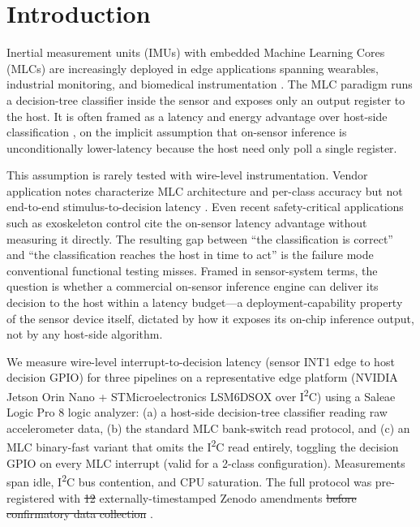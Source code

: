 \documentclass{IEEE_lsens}
\providecommand{\DIFadd}[1]{{\protect\color{blue}\uwave{#1}}} %
\providecommand{\DIFdel}[1]{{\protect\color{red}\sout{#1}}}                      %
\providecommand{\DIFaddbegin}{} %
\providecommand{\DIFaddend}{} %
\providecommand{\DIFdelbegin}{} %
\providecommand{\DIFdelend}{} %
\newcommand{\DIFscaledelfig}{0.5}
\newlength{\DIFdelgraphicswidth} %
\newlength{\DIFdelgraphicsheight} %
\newcommand{\DIFaddincludegraphics}[2][]{{\color{blue}\fbox{\DIFOincludegraphics[#1]{#2}}}} %
\newcommand{\DIFdelincludegraphics}[2][]{%
\sbox{\DIFdelgraphicsbox}{\DIFOincludegraphics[#1]{#2}}%
\settoboxwidth{\DIFdelgraphicswidth}{\DIFdelgraphicsbox} %
\settoboxtotalheight{\DIFdelgraphicsheight}{\DIFdelgraphicsbox} %
\scalebox{\DIFscaledelfig}{%
\parbox[b]{\DIFdelgraphicswidth}{\usebox{\DIFdelgraphicsbox}\\[-\baselineskip] \rule{\DIFdelgraphicswidth}{0em}}\llap{\resizebox{\DIFdelgraphicswidth}{\DIFdelgraphicsheight}{%
\setlength{\unitlength}{\DIFdelgraphicswidth}%
\begin{picture}(1,1)%
\thicklines\linethickness{2pt} %
{\color[rgb]{1,0,0}\put(0,0){\framebox(1,1){}}}%
{\color[rgb]{1,0,0}\put(0,0){\line( 1,1){1}}}%
{\color[rgb]{1,0,0}\put(0,1){\line(1,-1){1}}}%
\end{picture}%
}\hspace*{3pt}}} %
} %
\DeclareRobustCommand{\DIFaddbegin}{\DIFOaddbegin \let\includegraphics\DIFaddincludegraphics} %
\DeclareRobustCommand{\DIFaddend}{\DIFOaddend \let\includegraphics\DIFOincludegraphics} %
\DeclareRobustCommand{\DIFdelbegin}{\DIFOdelbegin \let\includegraphics\DIFdelincludegraphics} %
\DeclareRobustCommand{\DIFdelend}{\DIFOaddend \let\includegraphics\DIFOincludegraphics} %
\begin{document}
\maketitle

\section{Introduction}

Inertial measurement units (IMUs) with embedded Machine Learning Cores (MLCs) are increasingly deployed in edge applications spanning wearables, industrial monitoring, and biomedical instrumentation \cite{ref1}. The MLC paradigm runs a decision-tree classifier inside the sensor and exposes only an output register to the host. It is often framed as a latency and energy advantage over host-side classification \cite{ref2,ref3}, on the implicit assumption that on-sensor inference is unconditionally lower-latency because the host need only poll a single register.

This assumption is rarely tested with wire-level instrumentation. Vendor application notes characterize MLC architecture and per-class accuracy but not end-to-end stimulus-to-decision latency \cite{ref2}. Even recent safety-critical applications such as exoskeleton control \cite{ref3} cite the on-sensor latency advantage without measuring it directly. The resulting gap between ``the classification is correct'' and ``the classification reaches the host in time to act'' is the failure mode conventional functional testing misses. Framed in sensor-system terms, the question is whether a commercial on-sensor inference engine can deliver its decision to the host within a latency budget---a deployment-capability property of the sensor device itself, dictated by how it exposes its on-chip inference output, not by any host-side algorithm.

We measure wire-level interrupt-to-decision latency (sensor INT1 edge to host decision GPIO) for three pipelines on a representative edge platform (NVIDIA Jetson Orin Nano + STMicroelectronics LSM6DSOX over I\textsuperscript{2}C) using a Saleae Logic Pro 8 logic analyzer: (a) a host-side decision-tree classifier reading raw accelerometer data, (b) the standard MLC bank-switch read protocol, and (c) an MLC binary-fast variant that omits the I\textsuperscript{2}C read entirely, toggling the decision GPIO on every MLC interrupt (valid for a 2-class configuration). Measurements span idle, I\textsuperscript{2}C bus contention, and CPU saturation. The full protocol was pre-registered with \DIFdelbegin \DIFdel{12 }\DIFdelend \DIFaddbegin \DIFadd{13 }\DIFaddend externally-timestamped Zenodo amendments \DIFdelbegin \DIFdel{before confirmatory data collection }\DIFdelend \cite{ref4}.
\end{document}
